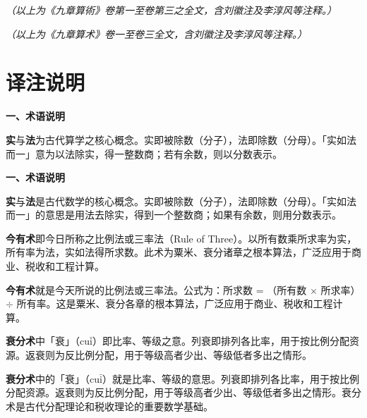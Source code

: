 \documentclass[10pt,a4paper]{article}
\newlength{\lw}
\newlength{\rw}
\newcommand{\biling}[2]{%
  \par\vspace{0.2em}%
  \noindent%
  \colorbox{classicalbg}{\parbox{\dimexpr\lw-2\fboxsep\relax}{#1}}%
  \hfill%
  \colorbox{modernbg}{\parbox{\dimexpr\rw-2\fboxsep\relax}{#2}}%
  \vspace{0.2em}%
}
\newcommand{\sk}{\vspace{0.1em}}
\begin{document}
\vspace{0.3em}

\biling{
\begin{center}\textit{（以上为《九章算術》卷第一至卷第三之全文，含刘徽注及李淳风等注释。）}\end{center}
}{
\begin{center}\textit{（以上为《九章算术》卷一至卷三全文，含刘徽注及李淳风等注释。）}\end{center}
}

\newpage

\section*{译注说明}

\biling{
\textbf{一、术语说明}

\textbf{实}与\textbf{法}为古代算学之核心概念。实即被除数（分子），法即除数（分母）。「实如法而一」意为以法除实，得一整数商；若有余数，则以分数表示。
}{
\textbf{一、术语说明}

\textbf{实}与\textbf{法}是古代数学的核心概念。实即被除数（分子），法即除数（分母）。「实如法而一」的意思是用法去除实，得到一个整数商；如果有余数，则用分数表示。
}

\sk

\biling{
\textbf{今有术}即今日所称之比例法或三率法（Rule of Three）。以所有数乘所求率为实，所有率为法，实如法得所求数。此术为粟米、衰分诸章之根本算法，广泛应用于商业、税收和工程计算。
}{
\textbf{今有术}就是今天所说的比例法或三率法。公式为：所求数 = （所有数 $\times$ 所求率）$\div$ 所有率。这是粟米、衰分各章的根本算法，广泛应用于商业、税收和工程计算。
}

\sk

\biling{
\textbf{衰分术}中「衰」（cu$\bar{\mathrm{i}}$）即比率、等级之意。列衰即排列各比率，用于按比例分配资源。返衰则为反比例分配，用于等级高者少出、等级低者多出之情形。
}{
\textbf{衰分术}中的「衰」（cu$\bar{\mathrm{i}}$）就是比率、等级的意思。列衰即排列各比率，用于按比例分配资源。返衰则为反比例分配，用于等级高者少出、等级低者多出之情形。衰分术是古代分配理论和税收理论的重要数学基础。
}

\sk
\end{document}
